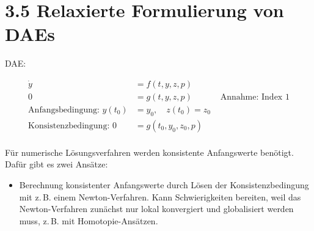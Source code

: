 \section*{3.5 Relaxierte Formulierung von DAEs}

DAE:

\begin{align*}
\dot y &= f(t,y,z,p) \\
0 &= g(t,y,z,p) & \text{ Annahme: Index 1}\\
\text{Anfangsbedingung: } y(t_0) &= y_0, \quad z(t_0) = z_0\\
\text{Konsistenzbedingung: } 0 &= g(t_0, y_0, z_0, p) \\
\end{align*}

Für numerische Lösungsverfahren werden konsistente Anfangswerte benötigt. Dafür gibt es zwei Ansätze:

\begin{itemize}
\item Berechnung konsistenter Anfangswerte durch Lösen der Konsistenzbedingung mit z.\,B. einem Newton-Verfahren. Kann Schwierigkeiten bereiten, weil das Newton-Verfahren zunächst nur lokal konvergiert und globalisiert werden muss, z.\,B. mit Homotopie-Ansätzen.
\end{itemize}






